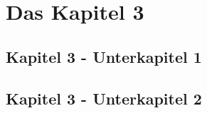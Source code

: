 
\chapter{Das Kapitel 3}
\label{Kapitel 3}
%


\section{Kapitel 3 - Unterkapitel 1}
\label{Kapitel_3_-_Unterkapitel_1}
%





\section{Kapitel 3 - Unterkapitel 2}
\label{Kapitel_3_-_Unterkapitel_2}
%

